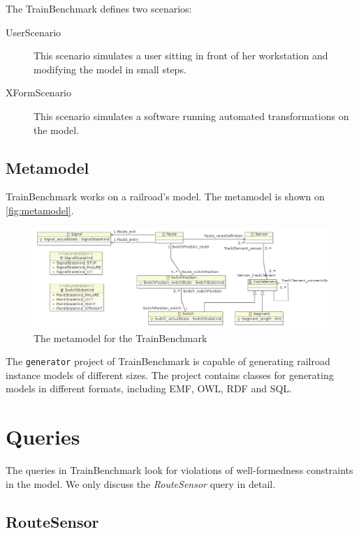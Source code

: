 The TrainBenchmark defines two scenarios:

\begin{description}
  \item[UserScenario] This scenario simulates a user sitting in front of her workstation and modifying the model in small steps.
  \item[XFormScenario] This scenario simulates a software running automated transformations on the model.
\end{description}

\subsection{Metamodel}

TrainBenchmark works on a railroad's model. The metamodel is shown on \autoref{fig:metamodel}.

\begin{figure}
\begin{center}
\includegraphics[width=14cm]{figures/TrainMetamodel}
\caption{The metamodel for the TrainBenchmark}
\label{fig:metamodel}
\end{center}
\end{figure}

The \texttt{generator} project of TrainBenchmark is capable of generating railroad instance models of different sizes. The project contains classes for generating models in different formats, including EMF, OWL, RDF and SQL.

\section{Queries}

The queries in TrainBenchmark look for violations of well-formedness constraints in the model. We only discuss the \textit{RouteSensor} query in detail.

\subsection{RouteSensor}

